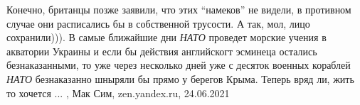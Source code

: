 Конечно, британцы позже заявили, что этих \enquote{намеков} не видели, в противном
случае они расписались бы в собственной трусости. А так, мол, лицо
сохранили))). В самые ближайшие дни \emph{НАТО} проведет морские учения в акватории
Украины и если бы действия английскогт эсминеца остались безнаказанными, то уже
через несколько дней уже с десяток военных кораблей \emph{НАТО} безнаказанно шныряли
бы прямо у берегов Крыма. Теперь вряд ли, жить то хочется ...
, 
Мак Сим, zen.yandex.ru, 24.06.2021

